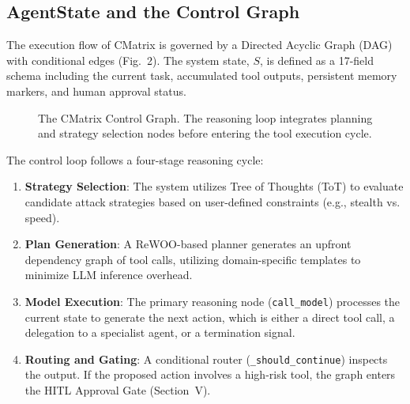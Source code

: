 \documentclass[conference,compsoc]{IEEEtran}
\begin{document}
\subsection{AgentState and the Control Graph}
The execution flow of CMatrix is governed by a Directed Acyclic Graph (DAG) with conditional edges (Fig.~2). The system state, $S$, is defined as a 17-field schema including the current task, accumulated tool outputs, persistent memory markers, and human approval status.

\begin{figure}[htbp]
\centering
{}
\caption{The CMatrix Control Graph. The reasoning loop integrates planning and strategy selection nodes before entering the tool execution cycle.}
\label{fig:control}
\end{figure}

The control loop follows a four-stage reasoning cycle:
\begin{enumerate}
    \item \textbf{Strategy Selection}: The system utilizes Tree of Thoughts (ToT) to evaluate candidate attack strategies based on user-defined constraints (e.g., stealth vs. speed).
    \item \textbf{Plan Generation}: A ReWOO-based planner generates an upfront dependency graph of tool calls, utilizing domain-specific templates to minimize LLM inference overhead.
    \item \textbf{Model Execution}: The primary reasoning node (\texttt{call\_model}) processes the current state to generate the next action, which is either a direct tool call, a delegation to a specialist agent, or a termination signal.
    \item \textbf{Routing and Gating}: A conditional router (\texttt{\_should\_continue}) inspects the output. If the proposed action involves a high-risk tool, the graph enters the HITL Approval Gate (Section~V).
\end{enumerate}
\end{document}
